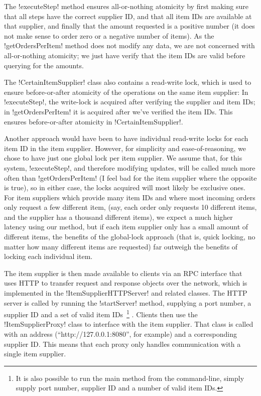 \documentclass[a4paper, 12pt]{article}
\begin{document}
The !executeStep! method ensures all-or-nothing atomicity by first
making sure that all steps have the correct supplier ID, and that all
item IDs are available at that supplier, and finally that the amount
requested is a positive number (it does not make sense to order zero
or a negative number of items). As the !getOrdersPerItem! method does
not modify any data, we are not concerned with all-or-nothing
atomicity; we just have verify that the item IDs are valid before
querying for the amounts.

The !CertainItemSupplier! class also contains a read-write lock, which
is used to ensure before-or-after atomicity of the operations on the
same item supplier: In !executeStep!, the write-lock is acquired after
verifying the supplier and item IDs; in !getOrdersPerItem! it is
acquired after we've verified the item IDs. This ensures
before-or-after atomicity in !CertainItemSupplier!.

Another approach would have been to have individual read-write locks
for each item ID in the item supplier. However, for simplicity and
ease-of-reasoning, we chose to have just one global lock per item
supplier. We assume that, for this system, !executeStep!, and
therefore modifying updates, will be called much more often than
!getOrdersPerItem! (I feel bad for the item supplier where the
opposite is true), so in either case, the locks acquired will most
likely be exclusive ones. For item suppliers which provide many item
IDs and where most incoming orders only request a few different item,
(say, each order only requests 10 different items, and the supplier
has a thousand different items), we expect a much higher latency using
our method, but if each item supplier only has a small amount of different
items, the benefits of the global-lock approach (that is, quick
locking, no matter how many different items are requested) far
outweigh the benefits of locking each individual item.

The item supplier is then made available to clients via an RPC
interface that uses HTTP to transfer request and response objects over
the network, which is implemented in the !ItemSupplierHTTPServer! and
related classes. The HTTP server is called by running the
!startServer! method, supplying a port number, a supplier ID and a set
of valid item IDs~\footnote{It is also possible to run the main method
  from the command-line, simply supply port number, supplier ID and a
  number of valid item IDs. } . Clients then use the
!ItemSupplierProxy! class to interface with the item supplier. That
class is called with an address (``http://127.0.0.1:8080'', for
example) and a corresponding supplier ID. This means that each proxy
only handles communication with a single item supplier.
\end{document}
